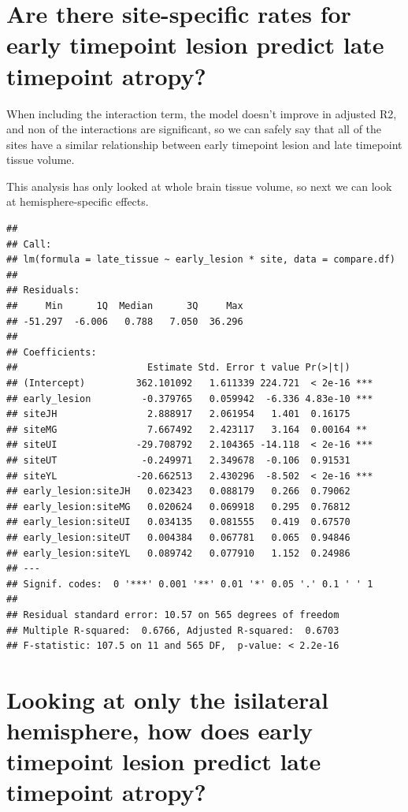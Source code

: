 \documentclass[
]{article}
\begin{document}
\hypertarget{are-there-site-specific-rates-for-early-timepoint-lesion-predict-late-timepoint-atropy}{%
\section{Are there site-specific rates for early timepoint lesion
predict late timepoint
atropy?}\label{are-there-site-specific-rates-for-early-timepoint-lesion-predict-late-timepoint-atropy}}

When including the interaction term, the model doesn't improve in
adjusted R2, and non of the interactions are significant, so we can
safely say that all of the sites have a similar relationship between
early timepoint lesion and late timepoint tissue volume.

This analysis has only looked at whole brain tissue volume, so next we
can look at hemisphere-specific effects.

\begin{verbatim}
## 
## Call:
## lm(formula = late_tissue ~ early_lesion * site, data = compare.df)
## 
## Residuals:
##     Min      1Q  Median      3Q     Max 
## -51.297  -6.006   0.788   7.050  36.296 
## 
## Coefficients:
##                       Estimate Std. Error t value Pr(>|t|)    
## (Intercept)         362.101092   1.611339 224.721  < 2e-16 ***
## early_lesion         -0.379765   0.059942  -6.336 4.83e-10 ***
## siteJH                2.888917   2.061954   1.401  0.16175    
## siteMG                7.667492   2.423117   3.164  0.00164 ** 
## siteUI              -29.708792   2.104365 -14.118  < 2e-16 ***
## siteUT               -0.249971   2.349678  -0.106  0.91531    
## siteYL              -20.662513   2.430296  -8.502  < 2e-16 ***
## early_lesion:siteJH   0.023423   0.088179   0.266  0.79062    
## early_lesion:siteMG   0.020624   0.069918   0.295  0.76812    
## early_lesion:siteUI   0.034135   0.081555   0.419  0.67570    
## early_lesion:siteUT   0.004384   0.067781   0.065  0.94846    
## early_lesion:siteYL   0.089742   0.077910   1.152  0.24986    
## ---
## Signif. codes:  0 '***' 0.001 '**' 0.01 '*' 0.05 '.' 0.1 ' ' 1
## 
## Residual standard error: 10.57 on 565 degrees of freedom
## Multiple R-squared:  0.6766, Adjusted R-squared:  0.6703 
## F-statistic: 107.5 on 11 and 565 DF,  p-value: < 2.2e-16
\end{verbatim}

\newpage

\hypertarget{looking-at-only-the-isilateral-hemisphere-how-does-early-timepoint-lesion-predict-late-timepoint-atropy}{%
\section{Looking at only the isilateral hemisphere, how does early
timepoint lesion predict late timepoint
atropy?}\label{looking-at-only-the-isilateral-hemisphere-how-does-early-timepoint-lesion-predict-late-timepoint-atropy}}
\end{document}
